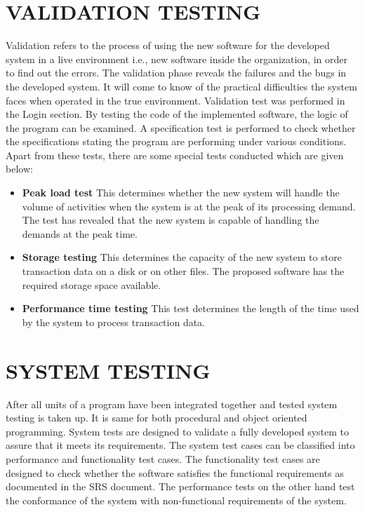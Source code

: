 \documentclass[12pt,a4paper,oneside]{report}
\begin{document}
\section{VALIDATION TESTING}
Validation refers to the process of using the new software for the developed system in a live environment i.e., new software inside the organization, in order to find out the errors. The validation phase reveals the failures and the bugs in the developed system. It will come to know of the practical difficulties the system faces when operated in the true environment. Validation test was performed in the Login section. By testing the code of the implemented software, the logic of the program can be examined. A specification test is performed to check whether the specifications stating the program are performing under various conditions. Apart from these tests, there are some special tests conducted which are given below:
\begin{itemize}
\item \textbf{Peak load test} This determines whether the new system will handle the volume of activities when the system is at the peak of its processing demand. The test has revealed that the new system is capable of handling the demands at the peak time.
\item \textbf{ Storage testing }  This determines the capacity of the new system to store transaction data on a disk or on other ﬁles. The proposed software has the required storage space available. 
\item \textbf{ Performance time testing } This test determines the length of the time used by the system to process transaction data.
 

\end{itemize}
 \section{SYSTEM TESTING}
 \par After all units of a program have been integrated together and tested system testing is taken up. It is same for both procedural and object oriented programming. System tests are designed to validate a fully developed system to assure that it meets its requirements. The system test cases can be classiﬁed into performance and functionality test cases. The functionality test cases are designed to check whether the software satisﬁes the functional requirements as documented in the SRS document. The performance tests on the other hand test the conformance of the system with non-functional requirements of the system.
\end{document}
